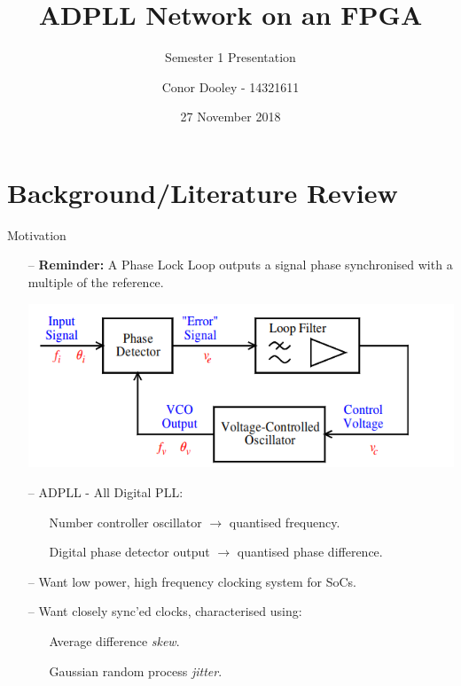 \documentclass{beamer}
\title{ADPLL Network on an FPGA}
\author{Conor Dooley - 14321611}%
\subtitle{Semester 1 Presentation}
\date{27 November 2018}
\institute{Supervisors: B. Mulkeen \& Dr. E. Blokhina}
\begin{document}
\begin{frame}
    \titlepage
\end{frame}

\section*{Background/Literature Review}
\begin{frame}{Motivation}
	\begin{itemize}
        \item[--]
            \textbf{Reminder:} A Phase Lock Loop outputs a signal phase synchronised with a multiple of the reference.
            \begin{center}
            \includegraphics[scale=0.3]{mulkeen_pll}
            \begin{tiny}\begin{flushright}\end{flushright}\end{tiny}
            \end{center}
        \item[--]
            ADPLL - All Digital PLL:
            \begin{itemize}
	        \item[]
	            Number controller oscillator $\rightarrow$ quantised frequency.
	        \item[]
	            Digital phase detector output $\rightarrow$ quantised phase difference.
        	\end{itemize}
        \end{itemize}
    \begin{itemize}
        \item[--]
        	Want low power, high frequency clocking system for SoCs.
        \item[--]
            Want closely sync'ed clocks, characterised using:
    		\begin{itemize}
    			\item[]
    				Average difference \textit{skew}.
    			\item[]
	    			Gaussian random process \textit{jitter}.
    		\end{itemize}
    \end{itemize}
\end{frame}
\end{document}
